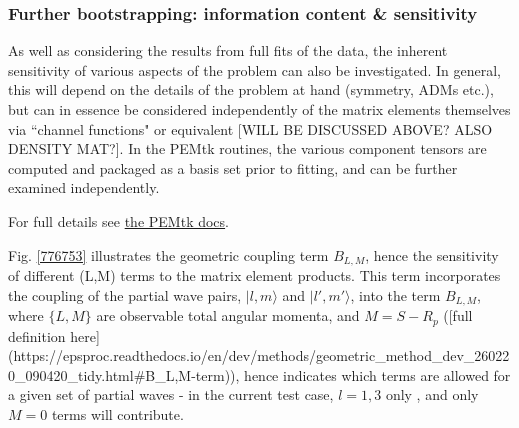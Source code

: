 \subsubsection{Further bootstrapping: information content \& sensitivity}

As well as considering the results from full fits of the data, the inherent sensitivity of various aspects of the problem can also be investigated. In general, this will depend on the details of the problem at hand (symmetry, ADMs etc.), but can in essence be considered independently of the matrix elements themselves via ``channel functions" or equivalent [WILL BE DISCUSSED ABOVE? ALSO DENSITY MAT?]. In the PEMtk routines, the various component tensors are computed and packaged as a basis set prior to fitting, and can be further examined independently. 

For full details see \href{https://pemtk.readthedocs.io/en/latest/fitting/PEMtk_fitting_basis-set_demo_050621-full.html}{the PEMtk docs}.

Fig. \ref{776753} illustrates the geometric coupling term $B_{L,M}$, hence the sensitivity of different (L,M) terms to the matrix element products. This term incorporates the coupling of the partial wave pairs, $|l,m\rangle$ and $|l',m'\rangle$, into the term $B_{L,M}$, where $\{L,M\}$ are observable total angular momenta, and $M = S-R_{p}$ ([full definition here](https://epsproc.readthedocs.io/en/dev/methods/geometric_method_dev_260220_090420_tidy.html#B_{L,M}-term)), hence indicates which terms are allowed for a given set of partial waves - in the current test case, $l=1,3$ only , and only $M=0$ terms will contribute.